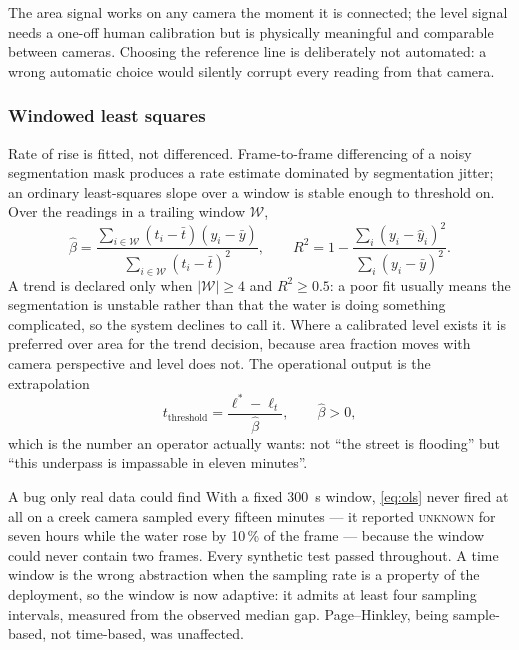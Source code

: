 The area signal works on any camera the moment it is connected; the level
signal needs a one-off human calibration but is physically meaningful and
comparable between cameras. Choosing the reference line is deliberately not
automated: a wrong automatic choice would silently corrupt every reading from
that camera.

\subsubsection{Windowed least squares}

Rate of rise is fitted, not differenced. Frame-to-frame differencing of
a noisy segmentation mask produces a rate estimate dominated by segmentation
jitter; an ordinary least-squares slope over a window is stable enough to
threshold on. Over the readings in a trailing window $\mathcal{W}$,
\begin{equation}
  \hat{\beta} = \frac{\sum_{i \in \mathcal{W}} (t_i - \bar{t})(y_i - \bar{y})}
                     {\sum_{i \in \mathcal{W}} (t_i - \bar{t})^{2}},
  \qquad
  R^{2} = 1 - \frac{\sum_i (y_i - \hat{y}_i)^{2}}
                   {\sum_i (y_i - \bar{y})^{2}}.
  \label{eq:ols}
\end{equation}
A trend is declared only when $|\mathcal{W}| \ge 4$ and $R^{2} \ge 0.5$: a
poor fit usually means the segmentation is unstable rather than that the water
is doing something complicated, so the system declines to call it. Where a
calibrated level exists it is preferred over area for the trend decision,
because area fraction moves with camera perspective and level does not. The
operational output is the extrapolation
\begin{equation}
  t_{\text{threshold}} = \frac{\ell^{*} - \ell_t}{\hat{\beta}},
  \qquad \hat{\beta} > 0,
  \label{eq:tttp}
\end{equation}
which is the number an operator actually wants: not ``the street is flooding''
but ``this underpass is impassable in eleven minutes''.

\begin{recorded}{A bug only real data could find}
With a fixed \SI{300}{\second} window, \cref{eq:ols} never fired at all on a
creek camera sampled every fifteen minutes — it reported \textsc{unknown} for
seven hours while the water rose by 10\,\% of the frame — because the window
could never contain two frames. Every synthetic test passed throughout. A time
window is the wrong abstraction when the sampling rate is a property of the
deployment, so the window is now adaptive: it admits at least four sampling
intervals, measured from the observed median gap. Page--Hinkley, being
sample-based, not time-based, was unaffected.
\end{recorded}

